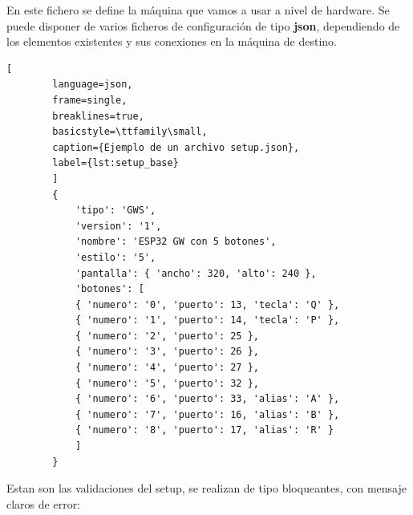 	En este fichero se define la máquina que vamos a usar a nivel de hardware.
	Se puede disponer de varios ficheros de configuración de tipo \textbf{json}, dependiendo de los elementos existentes y sus conexiones en la máquina de destino. 
		
	\begin{lstlisting}[
		language=json, 
		frame=single, 
		breaklines=true, 
		basicstyle=\ttfamily\small,
		caption={Ejemplo de un archivo setup.json},
		label={lst:setup_base}
		]
		{
			'tipo': 'GWS',                                       
			'version': '1',                                   
			'nombre': 'ESP32 GW con 5 botones',                 
			'estilo': '5',                                      
			'pantalla': { 'ancho': 320, 'alto': 240 },          
			'botones': [                                        
			{ 'numero': '0', 'puerto': 13, 'tecla': 'Q' },  
			{ 'numero': '1', 'puerto': 14, 'tecla': 'P' },  
			{ 'numero': '2', 'puerto': 25 },                
			{ 'numero': '3', 'puerto': 26 },                
			{ 'numero': '4', 'puerto': 27 },
			{ 'numero': '5', 'puerto': 32 },
			{ 'numero': '6', 'puerto': 33, 'alias': 'A' },
			{ 'numero': '7', 'puerto': 16, 'alias': 'B' },
			{ 'numero': '8', 'puerto': 17, 'alias': 'R' }
			]
		}
	\end{lstlisting}
	
	Estan son las validaciones del setup, se realizan de tipo bloqueantes, con mensaje claros de error:
	
